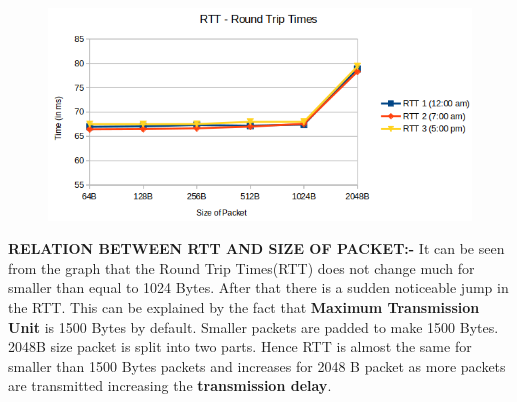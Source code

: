 \documentclass[a4paper,10pt]{article}
\newlength{\strutheight}
\begin{document}
\begin{enumerate}[a)]
\begin{adjustbox}{valign=T,raise=\strutheight,minipage={\linewidth}}
		\begin{figure}
			\includegraphics[width=12cm]{rtt2.png}
		\end{figure}
		\strut{}
		\textbf{RELATION BETWEEN RTT AND SIZE OF PACKET:-} It can be seen from the graph that the Round Trip Times(RTT) does not change much for smaller than equal to 1024 Bytes. After that there is a sudden noticeable jump in the RTT. This can be explained by the fact that \textbf{Maximum Transmission Unit} is 1500 Bytes by default. Smaller packets are padded to make 1500 Bytes. 2048B size packet is split into two parts. Hence RTT is almost the same for smaller than 1500 Bytes packets and increases for 2048 B packet as more packets are transmitted increasing the \textbf{transmission delay}.
	\end{adjustbox}
\end{enumerate}
\end{document}
